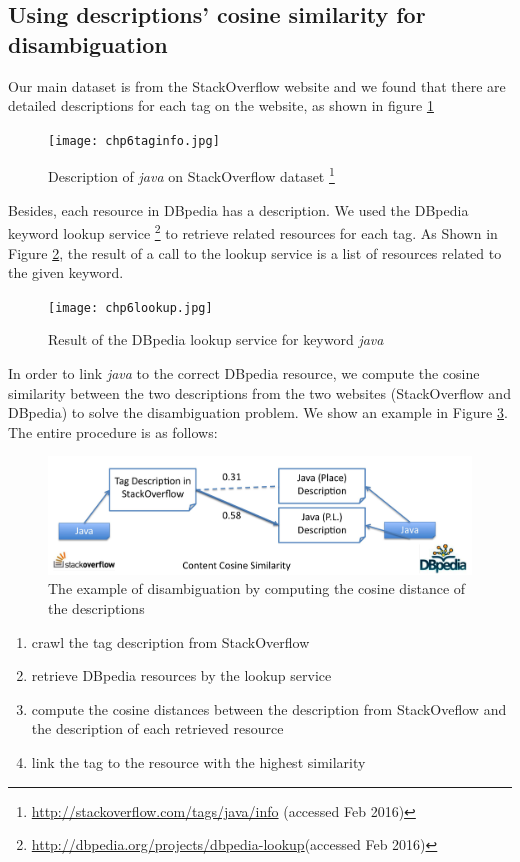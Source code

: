 \subsection{Using descriptions' cosine similarity for disambiguation}
Our main dataset is from the StackOverflow website and we found that there are detailed descriptions for each tag on the website, as shown in figure \ref{fig:chp6taginfo}
\begin{figure}[htp]
\centering
\texttt{[image: chp6taginfo.jpg]}  
\caption{Description of \textit{java} on StackOverflow dataset \footnote{\url{http://stackoverflow.com/tags/java/info} (accessed Feb 2016)}}
\label{fig:chp6taginfo} 
\end{figure}

Besides, each resource in DBpedia has a description.  We used the DBpedia keyword lookup service \footnote{\url{http://dbpedia.org/projects/dbpedia-lookup}(accessed Feb 2016)} to retrieve related resources for each tag. As Shown in Figure \ref{fig:chp6lookup}, the result of a call to the lookup service is a list of resources related to the given keyword.

\begin{figure}[htp]
\centering
\texttt{[image: chp6lookup.jpg]}  
\caption{Result of the DBpedia lookup service for keyword \textit{java}}
\label{fig:chp6lookup} 
\end{figure}

In order to link \textit{java} to the correct DBpedia resource, we compute the cosine similarity between the two descriptions from the two websites (StackOverflow and DBpedia) to solve the disambiguation problem. We show an example in Figure \ref{fig:chp6cosine}. The  entire procedure is as follows:

\begin{figure}[htp]
\centering
\includegraphics[width=5in]{chp6cosine.jpg}  
\caption{The example of disambiguation by computing the cosine distance of the descriptions }
\label{fig:chp6cosine} 
\end{figure}

\begin{enumerate}
    \item{crawl the tag description from StackOverflow}
    \item{retrieve DBpedia resources by the lookup service}
    \item{compute the cosine distances between the description from StackOveflow and the description of each retrieved resource}
    \item{link the tag to the resource with the highest similarity}
\end{enumerate}




